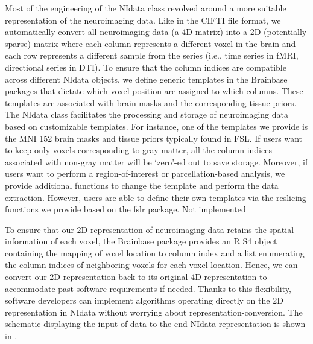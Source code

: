 \documentclass{nature}
\begin{document}
Most of the engineering of the NIdata class revolved around a more suitable
representation of the neuroimaging data. Like in the CIFTI file
format\cite{Glasser2013The},
we automatically convert all neuroimaging data (a 4D matrix)
into a 2D (potentially sparse) matrix where each
column represents a different voxel
in the brain and each row represents
a different sample from the series (i.e., time series in fMRI, directional
series in DTI). To ensure that the column indices are
compatible across different NIdata objects, we define generic templates in the
Brainbase packages that dictate which voxel position are assigned to which
columns.
These templates are associated with brain masks and the corresponding tissue
priors. 
The NIdata class facilitates the processing
and storage of neuroimaging data based on customizable
templates.
For instance, one of the templates we provide is the MNI 152 brain masks and
tissue priors typically found in FSL.
If users want to keep only voxels corresponding to gray matter, all the column
indices associated with non-gray matter will be `zero'-ed out to save storage.
Moreover, if users want to perform a
region-of-interest or parcellation-based analysis, we provide
additional functions to change the template and perform the data extraction.
However, users are able to define their own templates via the reslicing functions
we provide based on the fslr package. {\color{red}Not implemented}

To ensure that our 2D representation of neuroimaging data retains the
spatial information of each voxel, the Brainbase package provides
an R S4 object containing the mapping of voxel location to column index and
a list enumerating the column indices of neighboring voxels for each voxel
location. Hence, we can convert our 2D representation back to its original
4D representation to accommodate past software requirements if needed.
Thanks to this flexibility, software developers can
implement algorithms operating directly on the 2D representation in
NIdata without worrying about representation-conversion.  The
schematic displaying the input of data to the end NIdata representation
is shown in .
\end{document}
